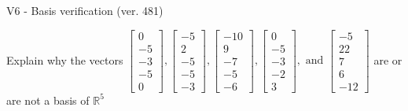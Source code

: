 \begin{exercise}
  \begin{exerciseTitle}V6 - Basis verification (ver. 481)\end{exerciseTitle}
  \begin{exerciseStatement}
    Explain why the vectors \(\left[\begin{array}{r}
0 \\
-5 \\
-3 \\
-5 \\
0
\end{array}\right] , \left[\begin{array}{r}
-5 \\
2 \\
-5 \\
-5 \\
-3
\end{array}\right] , \left[\begin{array}{r}
-10 \\
9 \\
-7 \\
-5 \\
-6
\end{array}\right] , \left[\begin{array}{r}
0 \\
-5 \\
-3 \\
-2 \\
3
\end{array}\right] , \text{ and } \left[\begin{array}{r}
-5 \\
22 \\
7 \\
6 \\
-12
\end{array}\right]\) are or are not a basis of \(\mathbb{R}^5\)	



\end{exerciseStatement}
\end{exercise}
